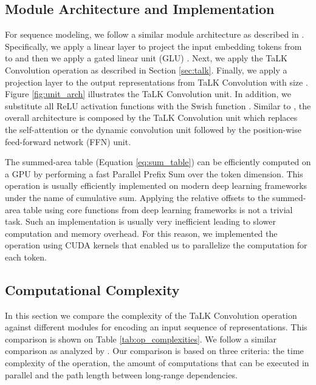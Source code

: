 \documentclass{article}
\def\talkconvfull{TaLK Convolution}
\begin{document}
\subsection{Module Architecture and Implementation}
\label{sec:arch}
For sequence modeling, we follow a similar module architecture as described in \citet{wu2019pay}. Specifically, we apply a linear layer to project the input embedding tokens from  to  and then we apply a gated linear unit (GLU) \cite{DBLP:journals/corr/DauphinFAG16}. Next, we apply the \talkconvfull{} operation as described in Section \ref{sec:talk}. Finally, we apply a projection layer to the output representations from \talkconvfull{} with size . Figure \ref{fig:unit_arch} illustrates the \talkconvfull{} unit. In addition, we substitute all ReLU activation functions with the Swish function \cite{DBLP:journals/corr/abs-1710-05941}. Similar to \cite{vaswani2017attention,wu2019pay}, the overall architecture is composed by the TaLK Convolution unit which replaces the self-attention or the dynamic convolution unit followed by the position-wise feed-forward network (FFN) unit.

The summed-area table (Equation \ref{eq:sum_table}) can be efficiently computed on a GPU by performing a fast Parallel Prefix Sum \cite{10.1145/322217.322232} over the token dimension. This operation is usually efficiently implemented on modern deep learning frameworks under the name of cumulative sum. Applying the relative offsets to the summed-area table using core functions from deep learning frameworks is not a trivial task. Such an implementation is usually very inefficient leading to slower computation and memory overhead. For this reason, we implemented the operation using CUDA kernels that enabled us to parallelize the computation for each token.


\subsection{Computational Complexity}
\label{sec:tcc}
In this section we compare the complexity of 
the \talkconvfull{} operation against different modules for encoding an input sequence of representations. This comparison is shown on Table \ref{tab:op_complexities}. We follow a similar comparison as analyzed by \citet{vaswani2017attention}. Our comparison is based on three criteria: the time complexity of the operation, the amount of computations that can be executed in parallel and the path length between long-range dependencies. 
\end{document}
